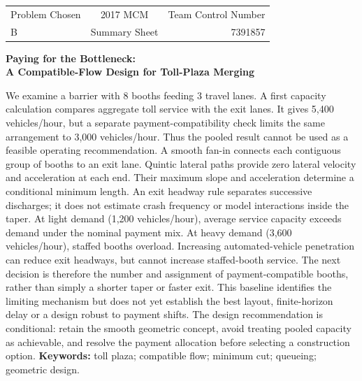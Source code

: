 \documentclass[12pt,letterpaper]{article}
\begin{document}
\thispagestyle{empty}
\noindent\begin{tabular*}{\textwidth}{@{\extracolsep{\fill}}lcr}
Problem Chosen & 2017 MCM & Team Control Number\\
\Large B & \Large Summary Sheet & \Large 7391857
\end{tabular*}
\vspace{1.0em}
\begin{center}{\LARGE\bfseries Paying for the Bottleneck:\\[4pt] A Compatible-Flow Design for Toll-Plaza Merging}\end{center}

We examine a barrier with 8 booths feeding 3 travel lanes. A first capacity calculation compares aggregate toll service with the exit lanes. It gives 5,400 vehicles/hour, but a separate payment-compatibility check limits the same arrangement to 3,000 vehicles/hour. Thus the pooled result cannot be used as a feasible operating recommendation.
A smooth fan-in connects each contiguous group of booths to an exit lane. Quintic lateral paths provide zero lateral velocity and acceleration at each end. Their maximum slope and acceleration determine a conditional minimum length. An exit headway rule separates successive discharges; it does not estimate crash frequency or model interactions inside the taper.
At light demand (1,200 vehicles/hour), average service capacity exceeds demand under the nominal payment mix. At heavy demand (3,600 vehicles/hour), staffed booths overload. Increasing automated-vehicle penetration can reduce exit headways, but cannot increase staffed-booth service. The next decision is therefore the number and assignment of payment-compatible booths, rather than simply a shorter taper or faster exit.
This baseline identifies the limiting mechanism but does not yet establish the best layout, finite-horizon delay or a design robust to payment shifts. The design recommendation is conditional: retain the smooth geometric concept, avoid treating pooled capacity as achievable, and resolve the payment allocation before selecting a construction option.
\noindent\textbf{Keywords:} toll plaza; compatible flow; minimum cut; queueing; geometric design.
\clearpage\tableofcontents\clearpage
\end{document}
